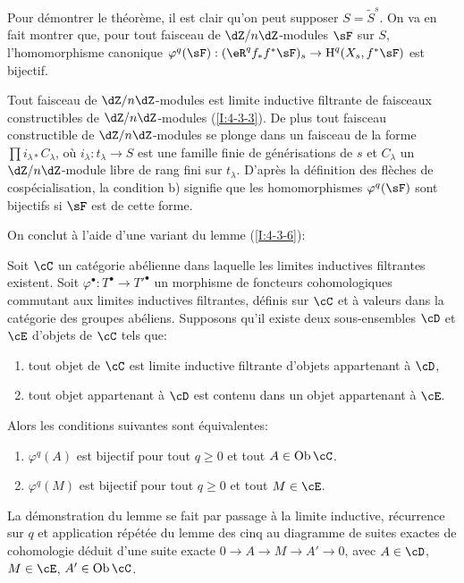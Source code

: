 Pour démontrer le théorème, il est clair qu'on peut supposer 
$S=\widetilde S^s$. On va en fait montrer que, pour tout faisceau de 
$\dZ/n\dZ$-modules $\sF$ sur $S$, l'homomorphisme canonique 
$\varphi^q(\sF):(\eR^q f_* f^* \sF)_s \to \h^q(X_s,f^*\sF)$ est bijectif. 

Tout faisceau de $\dZ/n\dZ$-modules est limite inductive filtrante de faisceaux 
constructibles de $\dZ/n\dZ$-modules (\ref{I:4-3-3}). De plus tout faisceau 
constructible de $\dZ/n\dZ$-modules se plonge dans un faisceau de la forme 
$\prod i_{\lambda *} C_\lambda$, où $i_\lambda:t_\lambda\to S$ est une 
famille finie de générisations de $s$ et $C_\lambda$ un $\dZ/n\dZ$-module 
libre de rang fini sur $t_\lambda$. D'après la définition des flèches de 
cospécialisation, la condition b) signifie que les homomorphismes 
$\varphi^q(\sF)$ sont bijectifs si $\sF$ est de cette forme. 

On conclut à l'aide d'une variant du lemme (\ref{I:4-3-6}):





\begin{lemma}\label{I:5-1-8}
Soit $\cC$ un catégorie abélienne dans laquelle les limites inductives 
filtrantes existent. Soit $\varphi^\bullet:T^\bullet\to{T'}^\bullet$ un 
morphisme de foncteurs cohomologiques commutant aux limites inductives 
filtrantes, définis sur $\cC$ et à valeurs dans la catégorie des groupes 
abéliens. Supposons qu'il existe deux sous-ensembles $\cD$ et $\cE$ d'objets 
de $\cC$ tels que:
\begin{enumerate}[\indent a)]
  \item tout objet de $\cC$ est limite inductive filtrante d'objets appartenant 
    à $\cD$, 
  \item tout objet appartenant à $\cD$ est contenu dans un objet appartenant 
    à $\cE$.
\end{enumerate}

Alors les conditions suivantes sont équivalentes: 
\begin{enumerate}[\indent (i)]
  \item $\varphi^q(A)$ est bijectif pour tout $q\geqslant 0$ et tout 
    $A\in\ob\cC$.
  \item $\varphi^q(M)$ est bijectif pour tout $q\geqslant 0$ et tout $M\in\cE$. 
\end{enumerate}
\end{lemma}

La démonstration du lemme se fait par passage à la limite inductive, 
récurrence sur $q$ et application répétée du lemme des cinq au diagramme 
de suites exactes de cohomologie déduit d'une suite exacte 
$0\to A\to M\to A'\to 0$, avec $A\in\cD$, $M\in\cE$, $A'\in \ob\cC$. 






